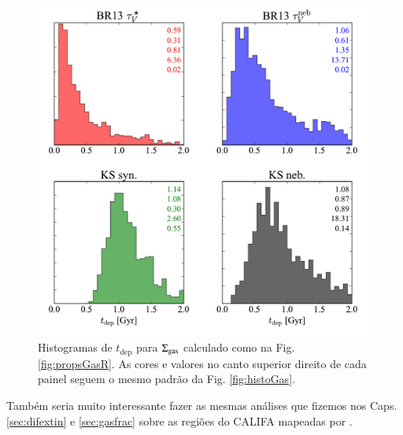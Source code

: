 \begin{figure}
	\centering
	\includegraphics[width=0.99\textwidth]{figuras/histo_tdep.pdf}
	\caption[Tempo de depleção do gás]
	{Histogramas de $t_{\mathrm{dep}}$ para $\Sigma_{\mathrm{gas}}$ calculado como na Fig. \ref{fig:propsGasR}.
As cores e valores no canto superior direito de cada painel seguem o mesmo padrão da Fig. \ref{fig:histoGas}.}
	\label{fig:tdep}
\end{figure}

Também seria muito interessante fazer as mesmas análises que fizemos nos Caps. \ref{sec:difextin} e
\ref{sec:gasfrac} sobre as regiões \Hii do CALIFA mapeadas por \citet{Sanchez.etal.2012b}.
% 

